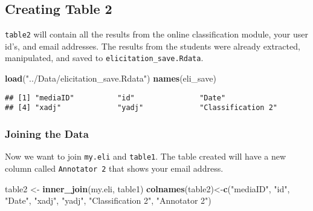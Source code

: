 \documentclass[]{article}
\newenvironment{Shaded}{\begin{snugshade}}{\end{snugshade}}
\newcommand{\KeywordTok}[1]{\textcolor[rgb]{0.13,0.29,0.53}{\textbf{#1}}}
\newcommand{\StringTok}[1]{\textcolor[rgb]{0.31,0.60,0.02}{#1}}
\newcommand{\OperatorTok}[1]{\textcolor[rgb]{0.81,0.36,0.00}{\textbf{#1}}}
\newcommand{\NormalTok}[1]{#1}
\begin{document}
\subsection{Creating Table 2}\label{creating-table-2}

\texttt{table2} will contain all the results from the online
classification module, your user id's, and email addresses. The results
from the students were already extracted, manipulated, and saved to
\texttt{elicitation\_save.Rdata}.

\begin{Shaded}
\begin{Highlighting}[]
\KeywordTok{load}\NormalTok{(}\StringTok{"../Data/elicitation_save.Rdata"}\NormalTok{)}
\KeywordTok{names}\NormalTok{(eli_save)}
\end{Highlighting}
\end{Shaded}

\begin{verbatim}
## [1] "mediaID"          "id"               "Date"            
## [4] "xadj"             "yadj"             "Classification 2"
\end{verbatim}

\begin{Shaded}
\end{Shaded}

\subsubsection{Joining the Data}\label{joining-the-data}

Now we want to join \texttt{my.eli} and \texttt{table1}. The table
created will have a new column called \texttt{Annotator\ 2} that shows
your email address.

\begin{Shaded}
\begin{Highlighting}[]
\NormalTok{table2 <-}\StringTok{ }\KeywordTok{inner_join}\NormalTok{(my.eli, table1)}
\KeywordTok{colnames}\NormalTok{(table2)<-}\KeywordTok{c}\NormalTok{(}\StringTok{"mediaID"}\NormalTok{,}
                    \StringTok{"id"}\NormalTok{,}
                    \StringTok{"Date"}\NormalTok{,}
                    \StringTok{"xadj"}\NormalTok{,}
                    \StringTok{"yadj"}\NormalTok{,}
                    \StringTok{"Classification 2"}\NormalTok{,}
                    \StringTok{"Annotator 2"}\NormalTok{)}
\end{Highlighting}
\end{Shaded}
\end{document}
